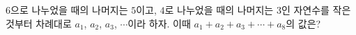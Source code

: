 $6$으로 나누었을 때의 나머지는 $5$이고, $4$로 나누었을 때의 나머지는 $3$인 자연수를 작은 것부터 차례대로 $a_1$, $a_2$, $a_3$, $\cdots$이라 하자. 이때 $a_1+a_2+a_3+\cdots+a_8$의 값은?
